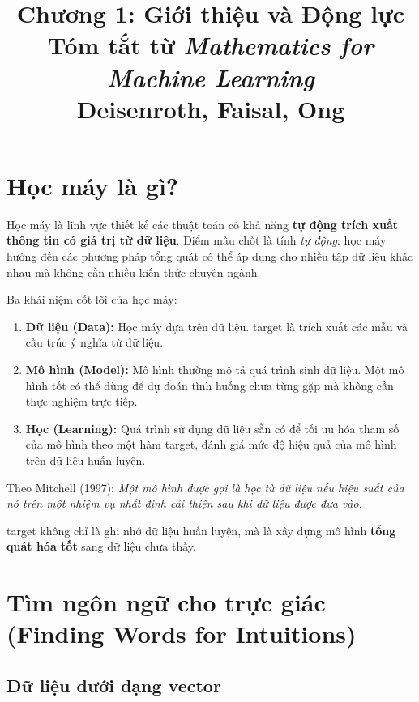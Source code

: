 \documentclass[12pt,a4paper]{article}
\title{\textbf{Chương 1: Giới thiệu và Động lực}\\[4pt]
\large Tóm tắt từ \textit{Mathematics for Machine Learning}\\
\normalsize Deisenroth, Faisal, Ong}
\author{}
\date{}
\begin{document}
\maketitle
\tableofcontents
\newpage

\section{Học máy là gì?}

Học máy là lĩnh vực thiết kế các thuật toán có khả năng \textbf{tự động trích xuất thông tin có giá trị từ dữ liệu}. Điểm mấu chốt là tính \emph{tự động}: học máy hướng đến các phương pháp tổng quát có thể áp dụng cho nhiều tập dữ liệu khác nhau mà không cần nhiều kiến thức chuyên ngành.

\begin{khainiembox}
Ba khái niệm cốt lõi của học máy:
\begin{enumerate}
  \item \textbf{Dữ liệu (Data):} Học máy dựa trên dữ liệu. target là trích xuất các mẫu và cấu trúc ý nghĩa từ dữ liệu.
  \item \textbf{Mô hình (Model):} Mô hình thường mô tả quá trình sinh dữ liệu. Một mô hình tốt có thể dùng để dự đoán tình huống chưa từng gặp mà không cần thực nghiệm trực tiếp.
  \item \textbf{Học (Learning):} Quá trình sử dụng dữ liệu sẵn có để tối ưu hóa tham số của mô hình theo một hàm target, đánh giá mức độ hiệu quả của mô hình trên dữ liệu huấn luyện.
\end{enumerate}
\end{khainiembox}

Theo Mitchell (1997): \emph{Một mô hình được gọi là học từ dữ liệu nếu hiệu suất của nó trên một nhiệm vụ nhất định cải thiện sau khi dữ liệu được đưa vào.}

\begin{luuybox}
target không chỉ là ghi nhớ dữ liệu huấn luyện, mà là xây dựng mô hình \textbf{tổng quát hóa tốt} sang dữ liệu chưa thấy.
\end{luuybox}

\section{Tìm ngôn ngữ cho trực giác (Finding Words for Intuitions)}

\subsection{Dữ liệu dưới dạng vector}
\end{document}
